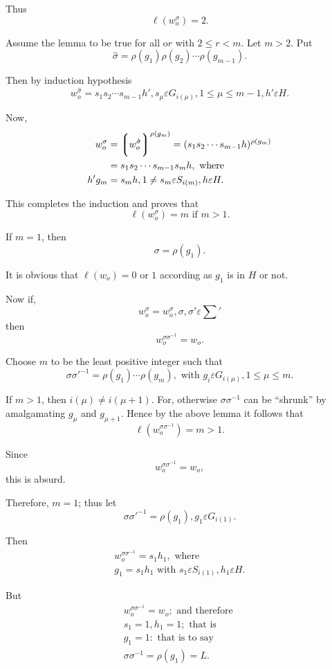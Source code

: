 Thus
$$
\ell (w_o ^{\sigma}) =2.
$$

Assume the lemma to be true for all o$r$ with $2 \leq r < m$. Let $m >
2$. Put 
$$
\hat{\sigma} = \rho (g_1)\rho (g_2) \cdots \rho (g_{m-1}).
$$

Then by induction hypothesis
$$
w_o^{\hat{\sigma}} = s_1 s_2 \cdots s_{m-1} h', s_{\mu} \varepsilon
G_{i (\mu)}, 1 \leq \mu \leq m-1,  h' \varepsilon H. 
$$

Now,
\begin{align*}
  w_o ^{\sigma} & = \bigg\lgroup w_o ^{\hat{\sigma}}\bigg\rgroup
  ^{\rho (g_m)} = (s_1 s_2 \cdots  s_{m-1} h) ^{\rho (g_m)}\\ 
  & = s_1 s_2 \cdots s_{m-1} s_m h, \text{ where }\\
  h' g_m &= s_m h,  1 \neq s_m \varepsilon S_{i (m)}, h \varepsilon H.
\end{align*}

This completes the induction and proves that
$$
\ell (w_o ^{\sigma}) = m \text{ if } m > 1.
$$

If $m=1$, then
$$
\sigma = \rho(g_1).
$$

It is obvious that $\ell (w_o) = 0  $ or $1$ according as $g_1$ is in
$H$ or not. 

Now if,
$$
w_o ^{\sigma} = w_o ^{\sigma}, \sigma, \sigma' \varepsilon \sum'
$$
then 
$$
w_o ^{\sigma \sigma^{-1}} = w_o.
$$

Choose $m$ to be the least positive integer such that 
$$
\sigma \sigma'^{-1} = \rho (g_1) \cdots \rho (g_m), \text{ with } g_i
\varepsilon G_{i (\mu)}, 1 \leq \mu \leq m. 
$$

If $m > 1$, then $i (\mu)\neq i (\mu + 1)$. For, otherwise $\sigma
\sigma^{-1}$ can be ``shrunk'' by amalgamating $g_{\mu}$ and $g_{\mu
  +1}$. Hence by the above lemma it follows that 
$$
\ell (w_o^{\sigma \sigma^{-1}} ) = m > 1.
$$

Since 
$$
w_o^{\sigma \sigma ^{-1}} = w_o,
$$
this is absurd.

Therefore, $ m = 1 $; thus let
$$
\sigma \sigma'^{-1} = \rho (g_1), g_1 \varepsilon G_{i (1)}.
$$

Then
\begin{gather*}
  w_o ^{\sigma \sigma^{-1}} = s_1 h_1, \text{ where }\\
  g_1 = s_1 h_1 \text{ with } s_1 \varepsilon S_{i (1)}, h_1 \varepsilon H.
\end{gather*}

But
\begin{gather*}
  w_o ^{\sigma \sigma^{-1}} = w_o; \text{ and therefore }\\
  s_1 = 1, h_1 = 1; \text{ that is }\\
  g_1 = 1 : \text{ that is to say }\\
  {\sigma \sigma^{-1}} = \rho (g_1) = L.
\end{gather*}

